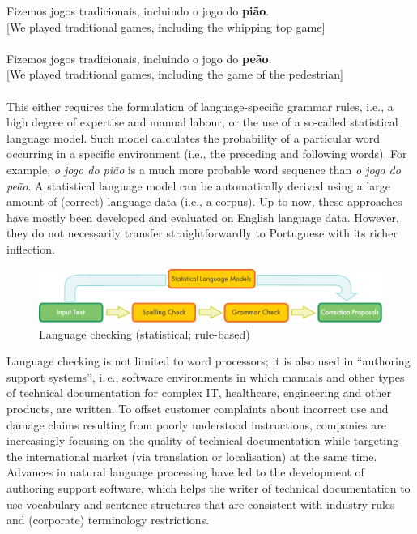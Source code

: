 \begin{multicols}{2}
Fizemos jogos tradicionais, incluindo o jogo do \textbf{pião}.\\
{[}We played traditional games, including the whipping top game{]}\\
\\
Fizemos jogos tradicionais, incluindo o jogo do \textbf{peão}.\\
{[}We played traditional games, including the game of the pedestrian{]}\\
\\
This either requires the formulation of language-specific grammar rules, i.e., a high degree of expertise and manual labour, or the use of a so-called statistical language model. Such model calculates the probability of a particular word occurring in a specific environment (i.e., the preceding and following words). For example, \textit{o jogo do pião} is a much more probable word sequence than \textit{o jogo do peão}. A statistical language model can be automatically derived using a large amount of (correct) language data (i.e., a corpus). Up to now, these approaches have mostly been developed and evaluated on English language data. However, they do not necessarily transfer straightforwardly to Portuguese with its richer inflection. 

\begin{figure}[htb]
  \center
  \includegraphics[width=\textwidth]{../_media/english/language_checking}
  \caption{Language checking (statistical; rule-based)}
  \label{fig:langcheckingaarch_en}
\end{figure}



Language checking is not limited to word processors; it is also used in “authoring support systems”, i.\,e., software environments in which manuals and other types of technical documentation for complex IT, healthcare, engineering and other products, are written. To offset customer complaints about incorrect use and damage claims resulting from poorly understood instructions, companies are increasingly focusing on the quality of technical documentation while targeting the international market (via translation or localisation) at the same time. Advances in natural language processing have led to the development of authoring support software, which helps the writer of technical documentation to use vocabulary and sentence structures that are consistent with industry rules and (corporate) terminology restrictions.


\end{multicols}

